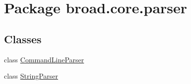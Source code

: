 \hypertarget{namespacebroad_1_1core_1_1parser}{\section{Package broad.\+core.\+parser}
\label{namespacebroad_1_1core_1_1parser}
}
\subsection*{Classes}
\begin{DoxyCompactItemize}
\item 
class \hyperlink{classbroad_1_1core_1_1parser_1_1_command_line_parser}{Command\+Line\+Parser}
\item 
class \hyperlink{classbroad_1_1core_1_1parser_1_1_string_parser}{String\+Parser}
\end{DoxyCompactItemize}
